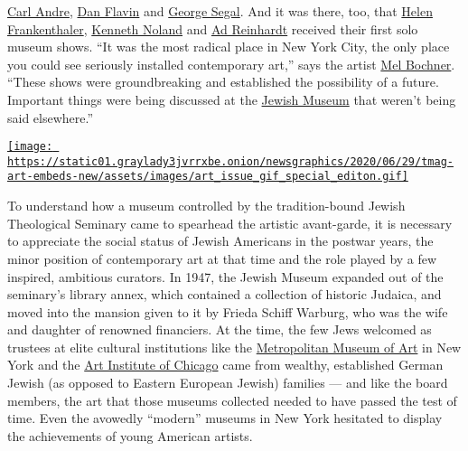 \href{https://www.nytimes3xbfgragh.onion/2014/05/05/arts/design/carl-andre-emerges-to-guide-installation-at-diabeacon.html}{Carl
Andre},
\href{https://www.nytimes3xbfgragh.onion/1996/12/04/arts/dan-flavin-63-sculptor-of-fluorescent-light-dies.html}{Dan
Flavin} and
\href{https://www.nytimes3xbfgragh.onion/2000/06/10/arts/george-segal-pop-sculptor-dies-at-75-molded-plaster-people-of-a-ghostly-angst.html}{George
Segal}. And it was there, too, that
\href{https://www.nytimes3xbfgragh.onion/2011/12/28/arts/helen-frankenthaler-abstract-painter-dies-at-83.html}{Helen
Frankenthaler},
\href{https://www.nytimes3xbfgragh.onion/2010/01/06/arts/06noland.html}{Kenneth
Noland} and
\href{https://www.nytimes3xbfgragh.onion/topic/person/ad-reinhardt}{Ad
Reinhardt} received their first solo museum shows. ``It was the most
radical place in New York City, the only place you could see seriously
installed contemporary art,'' says the artist
\href{https://www.nytimes3xbfgragh.onion/2019/11/26/t-magazine/mel-bochner.html}{Mel
Bochner}. ``These shows were groundbreaking and established the
possibility of a future. Important things were being discussed at the
\href{https://www.nytimes3xbfgragh.onion/topic/organization/jewish-museum-nyc}{Jewish
Museum} that weren't being said elsewhere.''

\href{https://www.nytimes3xbfgragh.onion/issue/t-magazine/2020/07/02/true-believers-art-issue}{\texttt{[image: https://static01.graylady3jvrrxbe.onion/newsgraphics/2020/06/29/tmag-art-embeds-new/assets/images/art\_issue\_gif\_special\_editon.gif]}}

To understand how a museum controlled by the tradition-bound Jewish
Theological Seminary came to spearhead the artistic avant-garde, it is
necessary to appreciate the social status of Jewish Americans in the
postwar years, the minor position of contemporary art at that time and
the role played by a few inspired, ambitious curators. In 1947, the
Jewish Museum expanded out of the seminary's library annex, which
contained a collection of historic Judaica, and moved into the mansion
given to it by Frieda Schiff Warburg, who was the wife and daughter of
renowned financiers. At the time, the few Jews welcomed as trustees at
elite cultural institutions like the
\href{https://www.nytimes3xbfgragh.onion/topic/organization/metropolitan-museum-of-art}{Metropolitan
Museum of Art} in New York and the
\href{https://www.nytimes3xbfgragh.onion/topic/organization/art-institute-of-chicago}{Art
Institute of Chicago} came from wealthy, established German Jewish (as
opposed to Eastern European Jewish) families --- and like the board
members, the art that those museums collected needed to have passed the
test of time. Even the avowedly ``modern'' museums in New York hesitated
to display the achievements of young American artists.

